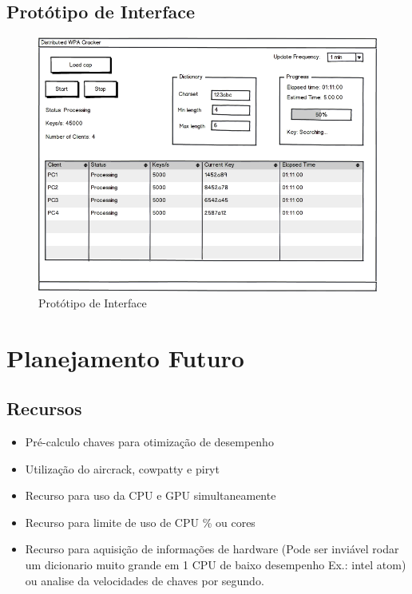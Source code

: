 \documentclass[12pt,a4paper]{abnt}
\begin{document}
			
		
		\clearpage
		\section{Protótipo de Interface}
		
			\begin{figure}[htp]
				\begin{center}
				  \includegraphics[width=450px]{mockup}
				  \caption{Protótipo de Interface}
				  \label{fig:prototipoInterface}
				\end{center}
			\end{figure}
			\FloatBarrier

\chapter{Planejamento Futuro}
	\section{Recursos}
		\begin{itemize}
			\item Pré-calculo chaves para otimização de desempenho
			\item Utilização do aircrack, cowpatty e piryt
			\item Recurso para uso da CPU e GPU simultaneamente
			\item Recurso para limite de uso de CPU \% ou cores
			\item Recurso para aquisição de informações de hardware (Pode ser inviável rodar um dicionario muito grande em 1 CPU de baixo desempenho Ex.: intel atom) ou analise da velocidades de chaves por segundo.
		\end{itemize}
\end{document}
